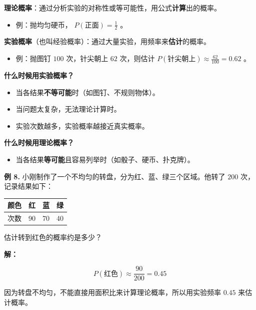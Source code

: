 \begin{understand}


\textbf{理论概率}：通过分析实验的对称性或等可能性，用公式\textbf{计算}出的概率。
\begin{itemize}
  \item 例：抛均匀硬币， $P(\text{正面}) = \frac{1}{2}$ 。
\end{itemize}


\textbf{实验概率}（也叫经验概率）：通过大量实验，用频率来\textbf{估计}的概率。
\begin{itemize}
  \item 例：抛图钉 $100$ 次，针尖朝上 $62$ 次，则估计 $P(\text{针尖朝上}) \approx \frac{62}{100} = 0.62$ 。
\end{itemize}


\textbf{什么时候用实验概率？}
\begin{itemize}
  \item 当各结果\textbf{不等可能}时（如图钉、不规则物体）。
  \item 当问题太复杂，无法理论计算时。
  \item 实验次数越多，实验概率越接近真实概率。
\end{itemize}


\textbf{什么时候用理论概率？}
\begin{itemize}
  \item 当各结果\textbf{等可能}且容易列举时（如骰子、硬币、扑克牌）。
\end{itemize}


\end{understand}

\begin{workedexamples}


\textbf{例 8.} 小刚制作了一个不均匀的转盘，分为红、蓝、绿三个区域。他转了 $200$ 次，记录结果如下：

\begin{center}
\begin{tabular}{llll}
\toprule
颜色 & 红 & 蓝 & 绿 \\
\midrule
次数 & 90 & 70 & 40 \\
\bottomrule
\end{tabular}
\end{center}


估计转到红色的概率约是多少？

\textbf{解：}

\[
P(\text{红色}) \approx \frac{90}{200} = 0.45
\]


因为转盘不均匀，不能直接用面积比来计算理论概率，所以用实验频率 $0.45$ 来估计概率。

\end{workedexamples}

